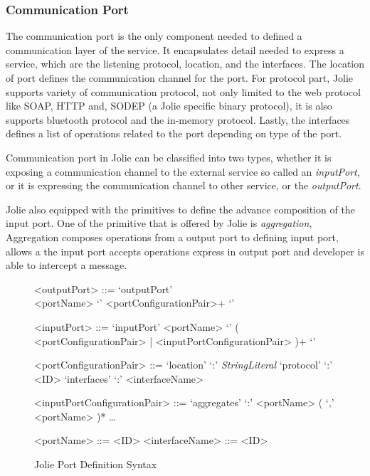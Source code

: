 \subsubsection{Communication Port}

The communication port is the only component needed to defined a communication layer of the service.
It encapsulates detail needed to express a service, which are the listening protocol, location, and the interfaces. The location of port defines the communication channel for the port. For protocol part, Jolie supports variety of communication protocol, not only limited to the web protocol like SOAP, HTTP and, SODEP (a Jolie specific binary protocol), it is also supports bluetooth protocol and the in-memory protocol. Lastly, the interfaces defines a list of operations related to the port depending on type of the port.

Communication port in Jolie can be classified into two types, whether it is exposing a communication channel to the external service so called an \textit{inputPort}, or it is expressing the communication channel to other service, or the \textit{outputPort}.

Jolie also equipped with the primitives to define the advance composition of the input port. One of the primitive that is offered by Jolie is \textit{aggregation}, Aggregation composes operations from a output port to defining input port, allows a the input port accepts operations express in output port and developer is able to intercept a message.

\begin{figure}[ht]
    \begin{framed}
        \begin{grammar}

            <outputPort> ::= `outputPort' \\ <portName> `{' <portConfigurationPair>+ `}'

            <inputPort>
            ::= `inputPort' <portName> `{' ( <portConfigurationPair> | <inputPortConfigurationPair> )+ `}'

            <portConfigurationPair>
            ::= `location' `:' \textit{StringLiteral}
            \alt `protocol' `:' <ID>
            \alt `interfaces' `:' <interfaceName>

            <inputPortConfigurationPair>
            ::=  `aggregates' `:' <portName> ( `,' <portName> )* \alt \dots

            <portName> ::= <ID>
            <interfaceName> ::= <ID>

        \end{grammar}
    \end{framed}
    \caption{Jolie Port Definition Syntax}
\end{figure}


